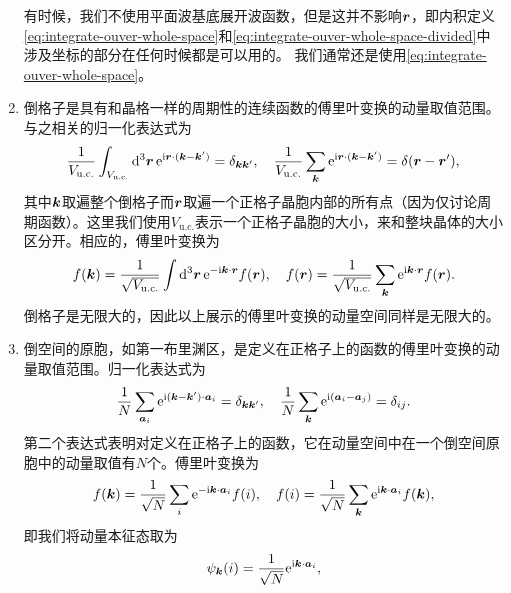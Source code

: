 \begin{enumerate}
    有时候，我们不使用平面波基底展开波函数，但是这并不影响$\vb*{r}$，即内积定义\eqref{eq:integrate-ouver-whole-space}和\eqref{eq:integrate-ouver-whole-space-divided}中涉及坐标的部分在任何时候都是可以用的。
    我们通常还是使用\eqref{eq:integrate-ouver-whole-space}。

    \item 倒格子是具有和晶格一样的周期性的连续函数的傅里叶变换的动量取值范围。与之相关的归一化表达式为
    \begin{equation}
        \frac{1}{V_\text{u.c.}} \int_{V_\text{u.c.}} \dd[3]{\vb*{r}} \mathrm{e}^{\mathrm{i} \vb*{r} \cdot (\vb*{k} - \vb*{k}')} = \delta_{\vb*{k} \vb*{k}'}, \quad \frac{1}{V_\text{u.c.}} \sum_{\vb*{k}} \mathrm{e}^{\mathrm{i} \vb*{r} \cdot (\vb*{k} - \vb*{k}')} = \delta(\vb*{r} - \vb*{r}'), 
        \label{eq:normalization-periodic}
    \end{equation}
    其中$\vb*{k}$取遍整个倒格子而$\vb*{r}$取遍一个正格子晶胞内部的所有点（因为仅讨论周期函数）。这里我们使用$V_\text{u.c.}$表示一个正格子晶胞的大小，来和整块晶体的大小区分开。相应的，傅里叶变换为
    \begin{equation}
        f(\vb*{k}) = \frac{1}{\sqrt{V_\text{u.c.}}} \int \dd[3]{\vb*{r}} \mathrm{e}^{- \mathrm{i} \vb*{k} \cdot \vb*{r}} f(\vb*{r}), \quad f(\vb*{r}) = \frac{1}{\sqrt{V_\text{u.c.}}} \sum_{\vb*{k}} \mathrm{e}^{\mathrm{i} \vb*{k} \cdot \vb*{r}} f(\vb*{r}).
    \end{equation}
    倒格子是无限大的，因此以上展示的傅里叶变换的动量空间同样是无限大的。
    \item 倒空间的原胞，如第一布里渊区，是定义在正格子上的函数的傅里叶变换的动量取值范围。归一化表达式为
    \begin{equation}
        \frac{1}{N} \sum_{\vb*{a}_i} \mathrm{e}^{\mathrm{i} (\vb*{k} - \vb*{k}') \cdot \vb*{a}_i} = \delta_{\vb*{k} \vb*{k}'}, \quad \frac{1}{N} \sum_{\vb*{k}} \mathrm{e}^{\mathrm{i} (\vb*{a}_i - \vb*{a}_j)} = \delta_{ij}.
    \end{equation}
    第二个表达式表明对定义在正格子上的函数，它在动量空间中在一个倒空间原胞中的动量取值有$N$个。傅里叶变换为
    \begin{equation}
        f(\vb*{k}) = \frac{1}{\sqrt{N}} \sum_{i} \mathrm{e}^{- \mathrm{i} \vb*{k} \cdot \vb*{a}_i} f(i), \quad f(i) = \frac{1}{\sqrt{N}} \sum_{\vb*{k}} \mathrm{e}^{\mathrm{i} \vb*{k} \cdot \vb*{a}_i} f(\vb*{k}),
        \label{eq:lattice-fourier}
    \end{equation}
    即我们将动量本征态取为
    \begin{equation}
        \psi_{\vb*{k}}(i) = \frac{1}{\sqrt{N}} \mathrm{e}^{\mathrm{i} \vb*{k} \cdot \vb*{a}_i},
    \end{equation}

\end{enumerate}
